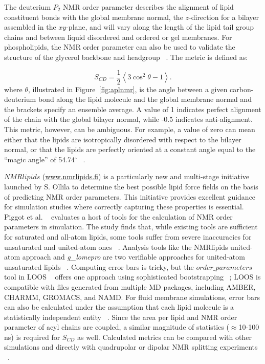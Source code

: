 \documentclass[9pt,bestpractices,pubversion]{livecoms}
\begin{document}
The deuterium $P_2$ NMR order parameter describes the alignment of lipid constituent bonds with the global membrane normal, the $z$-direction for a bilayer assembled in the $xy$-plane, and will vary along the length of the lipid tail group chains and between liquid disordered and ordered or gel membranes.
For phospholipids, the NMR order parameter can also be used to validate the structure of the glycerol backbone and headgroup ~\cite{Botan2015}.
The metric is defined as:

\begin{equation}\label{eq:6}
	S_{CD}=\frac{1}{2} \left<3\cos^2\theta-1 \right>.
\end{equation}
where $\theta$, illustrated in Figure~\ref{fig:aplnmr}, is the angle between a given carbon-deuterium bond along the lipid molecule and the global membrane normal and the brackets specify an ensemble average.
A value of 1 indicates perfect alignment of the chain with the global bilayer normal, while -0.5 indicates anti-alignment.
This metric, however, can be ambiguous.
For example, a value of zero can mean either that the lipids are isotropically disordered with respect to the bilayer normal, or that the lipids are perfectly oriented at a constant angle equal to the ``magic angle'' of 54.74$^{\circ}$ ~\cite{Poger2016}.

$NMRlipids$ (\url{www.nmrlipids.fi}) is a particularly new and multi-stage initiative launched by S. Ollila to determine the best possible lipid force fields on the basis of predicting NMR order parameters.
This initiative provides excellent guidance for simulation studies where correctly capturing these properties is essential.
Piggot et al. ~\cite{Piggot2017a} evaluates a host of tools for the calculation of NMR order parameters in simulation.
The study finds that, while existing tools are sufficient for saturated and all-atom lipids, some tools suffer from severe inaccuracies for unsaturated and united-atom ones ~\cite{Piggot2017a}.
Analysis tools like the NMRlipids united-atom approach and \textit{g\_lomepro} are two verifiable approaches for united-atom unsaturated lipids ~\cite{Piggot2017a}.
Computing error bars is tricky, but the $order\_parameters$ tool in LOOS ~\cite{Romo2009} offers one approach using sophisticated bootstrapping ~\cite{Romo2011}; LOOS is compatible with files generated from multiple MD packages, including AMBER, CHARMM, GROMACS, and NAMD.
For fluid membrane simulations, error bars can also be calculated under the assumption that each lipid molecule is a statistically independent entity ~\cite{Botan2015}.
Since the area per lipid and NMR order parameter of acyl chains are coupled, a similar magnitude of statistics ($\approx$10-100 ns) is required for $S_{CD}$ as well.
Calculated metrics can be compared with other simulations and directly with quadrupolar or dipolar NMR splitting experiments ~\cite{Ollila2016}.
\end{document}
